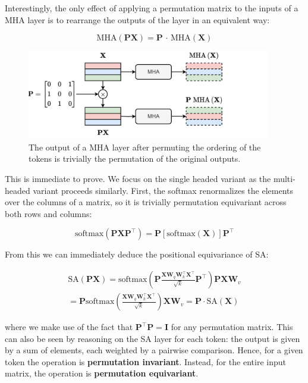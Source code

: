 Interestingly, the only effect of applying a permutation matrix to the inputs of a MHA layer is to rearrange the outputs of the layer in an equivalent way:

$$
\text{MHA}(\mathbf{P}\mathbf{X})=\mathbf{P}\,\cdot\,\text{MHA}(\mathbf{X})
$$

\begin{figure}[t]
    \centering
    \includegraphics[width=0.95\textwidth]{images/permutation_equivariance}
    \caption{The output of a MHA layer after permuting the ordering of the tokens is trivially the permutation of the original outputs.}
    \label{fig:permutation_equivariance_mha}
\end{figure}

This is immediate to prove. We focus on the single headed variant as the multi-headed variant proceeds similarly. First, the softmax renormalizes the elements over the columns of a matrix, so it is trivially permutation equivariant across both rows and columns:

$$
\text{softmax}(\mathbf{P}\mathbf{X}\mathbf{P}^\top)=\mathbf{P}\left[\text{softmax}(\mathbf{X})\right]\mathbf{P}^\top
$$

From this we can immediately deduce the positional equivariance of SA:

\begin{gather}
\text{SA}(\mathbf{P}\mathbf{X}) = \text{softmax}\left(\mathbf{P}\frac{\mathbf{X}\mathbf{W}_q\mathbf{W}_k^\top\mathbf{X}^\top}{\sqrt{k}}\mathbf{P}^\top\right)\mathbf{P}\mathbf{X}\mathbf{W}_v \\ = \mathbf{P}\text{softmax}\left(\frac{\mathbf{X}\mathbf{W}_q\mathbf{W}_k^\top\mathbf{X}^\top}{\sqrt{k}}\right)\mathbf{X}\mathbf{W}_v = \mathbf{P}\cdot\text{SA}(\mathbf{X})
\end{gather}

where we make use of the fact that $\mathbf{P}^\top \mathbf{P} = \mathbf{I}$ for any permutation matrix. This can also be seen by reasoning on the SA layer for each token: the output is given by a sum of elements, each weighted by a pairwise comparison. Hence, for a given token the operation is \textbf{permutation invariant}. Instead, for the entire input matrix, the operation is \textbf{permutation equivariant}.

